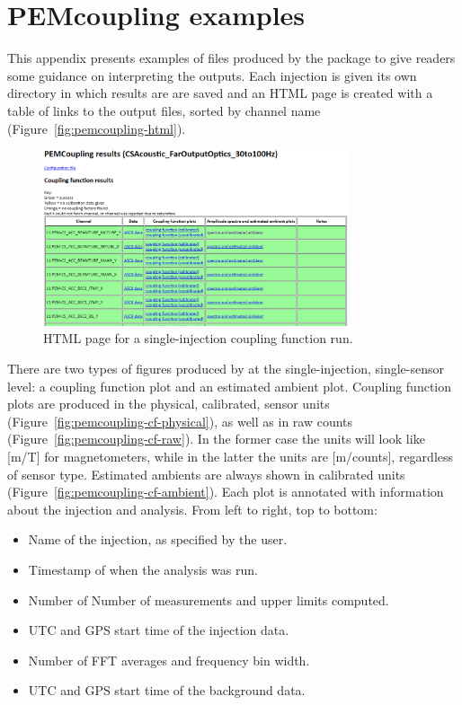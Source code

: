 \appendix

\renewcommand\thefigure{\thechapter.\arabic{figure}}
\renewcommand\thetable{\thechapter.\arabic{table}}
\setcounter{figure}{0}
\setcounter{table}{0}

\chapter{PEMcoupling examples}\label{app:pemcoupling}

This appendix presents examples of files produced by the \pemcoupling package to give readers some guidance on interpreting the outputs.
Each injection is given its own directory in which results are are saved and an HTML page is created with a table of links to the output files, sorted by channel name (Figure~\ref{fig:pemcoupling-html}).

\begin{figure}
  \centering
  \includegraphics[width=0.8\textwidth]{figures/appendix/pemcoupling-html.png}
  \caption{HTML page for a single-injection coupling function run.}
  \label{fig:pemcoupling-html }
\end{figure}

There are two types of figures produced by \pemcoupling at the single-injection, single-sensor level: a coupling function plot and an estimated ambient plot.
Coupling function plots are produced in the physical, calibrated, sensor units (Figure~\ref{fig:pemcoupling-cf-physical}), as well as in raw counts (Figure~\ref{fig:pemcoupling-cf-raw}).
In the former case the units will look like [m/T] for magnetometers, while in the latter the units are [m/counts], regardless of sensor type.
Estimated ambients are always shown in calibrated units (Figure~\ref{fig:pemcoupling-cf-ambient}).
Each plot is annotated with information about the injection and analysis.
From left to right, top to bottom:
\begin{itemize}
  \item Name of the injection, as specified by the user.
  \item Timestamp of when the analysis was run.
  \item Number of Number of measurements and upper limits computed.
  \item UTC and GPS start time of the injection data.
  \item Number of FFT averages and frequency bin width.
  \item UTC and GPS start time of the background data.
\end{itemize}

